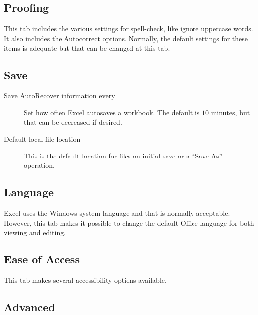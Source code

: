\subsection{Proofing}

This tab includes the various settings for spell-check, like ignore uppercase words. It also includes the Autocorrect options. Normally, the default settings for these items is adequate but that can be changed at this tab.

\subsection{Save}

\begin{description}
	\item[Save AutoRecover information every] Set how often Excel autosaves a workbook. The default is $ 10 $ minutes, but that can be decreased if desired.
	\item[Default local file location] This is the default location for files on initial save or a ``Save As'' operation.
\end{description}

\subsection{Language}

Excel uses the Windows system language and that is normally acceptable. However, this tab makes it possible to change the default Office language for both viewing and editing.

\subsection{Ease of Access}

This tab makes several accessibility options available. 

\subsection{Advanced}
	
